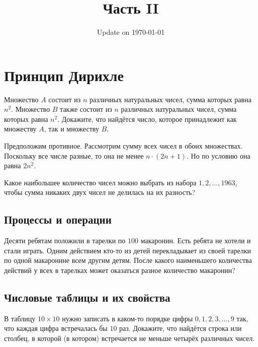 \documentclass[12pt]{book}
\begin{document}
\fontsize{12}{12}\selectfont

\title{\bf \huge Часть II}
\date{Update on \today}
\maketitle 


\chapter{Принцип Дирихле}

\begin{task}
Множество $A$ состоит из $n$ различных натуральных чисел, сумма которых равна $n^{2}$. Множество $B$ также состоит из $n$ различных натуральных чисел, сумма которых равна $n^{2}$. Докажите, что найдётся число, которое принадлежит как множеству $A$, так и множеству $B$.
\end{task}

\begin{solution}
Предположим противное. Рассмотрим сумму всех чисел в обоих множествах. Поскольку все числе разные, то она не менее $n \cdot (2n + 1)$. Но по условию она равна $2n^{2}$.
\end{solution}

\begin{task} 
Какое наибольшее количество чисел можно выбрать из набора $1, 2, \dots, 1963$, чтобы сумма никаких двух чисел не делилась на их разность?
\end{task}
 

\section*{Процессы и операции}

\begin{task}
Десяти ребятам положили в тарелки по $100$ макаронин. Есть ребята не хотели и стали играть. Одним действием кто-то из детей перекладывает из своей тарелки по одной макаронине всем другим детям. После какого наименьшего количества действий у всех в тарелках может оказаться разное количество макаронин?
\end{task}

\section*{Числовые таблицы и их свойства}

\begin{task}
В таблицу $10 \times 10$ нужно записать в каком-то порядке цифры  $0, 1, 2, 3, \dots, 9$  так, что каждая цифра встречалась бы $10$ раз. Докажите, что найдётся строка или столбец, в которой (в котором) встречается не меньше четырёх различных чисел. 
\end{task}
\end{document}
